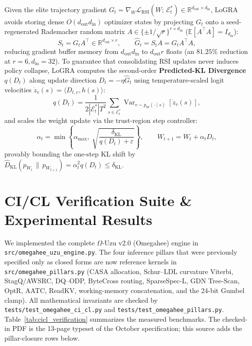 \documentclass[10pt,a4paper]{article}
\begin{document}
Given the elite trajectory gradient $G_t = \nabla_W \mathcal{L}_{\mathrm{RSI}}(W;\, \mathcal{E}_t^*) \in \mathbb{R}^{d_{\mathrm{out}} \times d_{\mathrm{in}}}$, LoGRA avoids storing dense $O(d_{\mathrm{out}} d_{\mathrm{in}})$ optimizer states by projecting $G_t$ onto a seed-regenerated Rademacher random matrix $A \in \{\pm 1/\sqrt{r}\}^{r \times d_{\mathrm{in}}}$ ($\mathbb{E}[A^\top A] = I_{d_{\mathrm{in}}}$):
\begin{equation}
  S_t = G_t A^\top \in \mathbb{R}^{d_{\mathrm{out}} \times r}, \qquad \widehat{G}_t = S_t A = G_t A^\top A,
\end{equation}
reducing gradient buffer memory from $d_{\mathrm{out}} d_{\mathrm{in}}$ to $d_{\mathrm{out}} r$ floats (an $81.25\%$ reduction at $r=6, d_{\mathrm{in}}=32$). To guarantee that consolidating RSI updates never induces policy collapse, LoGRA computes the second-order \textbf{Predicted-KL Divergence} $q(D_t)$ along update direction $D_t = -\eta \widehat{G}_t$ using temperature-scaled logit velocities $\dot{z}_v(s) = \langle D_{t,v}, h(s) \rangle$:
\begin{equation}
  q(D_t) = \frac{1}{2|\mathcal{E}_t^*| T^2} \sum_{s \in \mathcal{E}_t^*} \operatorname{Var}_{v \sim p_W(\cdot \mid s)}\!\left[\dot{z}_v(s)\right],
\end{equation}
and scales the weight update via the trust-region step controller:
\begin{equation}
  \alpha_t = \min\!\left\{ \alpha_{\max},\; \sqrt{\frac{\delta_{\mathrm{KL}}}{q(D_t) + \varepsilon}} \right\}, \qquad W_{t+1} = W_t + \alpha_t D_t,
\end{equation}
provably bounding the one-step KL shift by $\widehat{D}_{\mathrm{KL}}(p_{W_t} \,\|\, p_{W_{t+1}}) = \alpha_t^2 q(D_t) \le \delta_{\mathrm{KL}}$.

\section{CI/CL Verification Suite \& Experimental Results}

We implemented the complete $\Omega$-Uzu v2.0 (Omegahee) engine in \texttt{src/omegahee\_uzu\_engine.py}. The four inference pillars that were previously specified only as closed forms are now reference kernels in \texttt{src/omegahee\_pillars.py} (CASA allocation, Schur--LDL curvature Viterbi, StagQ/AWSRC, DQ--ODP, ByteCross routing, SparseSpec-L, GDN Tree-Scan, OptR, AATC, ReadKV, working-memory concatenation, and the 24-bit Gumbel clamp). All mathematical invariants are checked by \texttt{tests/test\_omegahee\_ci\_cl.py} and \texttt{tests/test\_omegahee\_pillars.py}. Table~\ref{tab:cicl_verification} summarizes the measured benchmarks. The checked-in PDF is the 13-page typeset of the October specification; this source adds the pillar-closure rows below.
\end{document}

